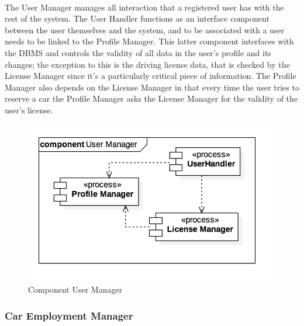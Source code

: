 		\paragraph{} The User Manager manages all interaction that a registered user has with the rest of the system. The User Handler functions as an interface component between the user themselves and the system, and to be associated with a user needs to be linked to the Profile Manager. This latter component interfaces with the DBMS and controls the validity of all data in the user's profile and its changes; the exception to this is the driving license data, that is checked by the License Manager since it's a particularly critical piece of information. The Profile Manager also depends on the License Manager in that every time the user tries to reserve a car the Profile Manager asks the License Manager for the validity of the user's license. 
		\begin{figure}[h]
			\includegraphics[scale=0.4, center]{img/component_diagrams/03_user_manager.png}
			\caption{Component User Manager}
		\end{figure}	
\FloatBarrier

		
		
		\subsubsection*{Car Employment Manager}
		
			
			
